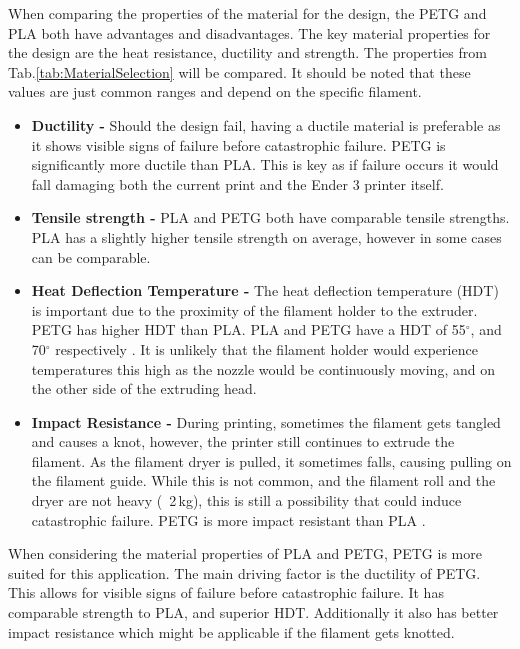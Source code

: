 When comparing the properties of the material for the design, the PETG and PLA both have advantages and disadvantages. The key material properties for the design are the heat resistance, ductility and strength. The properties from Tab.\ref{tab:MaterialSelection} will be compared. It should be noted that these values are just common ranges and depend on the specific filament. 
\begin{itemize}
	\item \textbf{{Ductility -}} Should the design fail, having a ductile material is preferable as it shows visible signs of failure before catastrophic failure. PETG is significantly more ductile than PLA\autocite{WhatPLAFilament}. This is key as if failure occurs it would fall damaging both the current print and the Ender 3 printer itself.
	\item \textbf{Tensile strength -} PLA and PETG both have comparable tensile strengths. PLA has a slightly higher tensile strength on average\autocite{PLAvsPETGUltimaker}, however in some cases can be comparable\autocite{WhatPLAFilament}.  
	\item \textbf{Heat Deflection Temperature -} The heat deflection temperature (HDT) is important due to the proximity of the filament holder to the extruder. PETG has higher HDT than PLA. PLA and PETG have a HDT of 55$^\circ$, and 70$^\circ$ respectively \autocite{PLAvsPETGUltimaker}. It is unlikely that the filament holder would experience temperatures this high as the nozzle would be continuously moving, and on the other side of the extruding head.
	\item \textbf{Impact Resistance -} During printing, sometimes the filament gets tangled and causes a knot, however, the printer still continues to extrude the filament. As the filament dryer is pulled, it sometimes falls, causing pulling on the filament guide. While this is not common, and the filament roll and the dryer are not heavy (~2\,kg), this is still a possibility that could induce catastrophic failure. PETG is more impact resistant than PLA \autocite{PLAvsPETGUltimaker}.   
\end{itemize} 


When considering the material properties of PLA and PETG, PETG is more suited for this application. The main driving factor is the ductility of PETG. This allows for visible signs of failure before catastrophic failure. It has comparable strength to PLA, and superior HDT. Additionally it also has better impact resistance which might be applicable if the filament gets knotted.  


